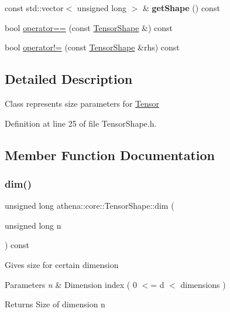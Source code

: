 \begin{DoxyCompactItemize}
\item 
\mbox{\label{classathena_1_1core_1_1_tensor_shape_ab76bd8f258b315eedcae3eae2d46a73d}} 
const std\+::vector$<$ unsigned long $>$ \& {\bfseries get\+Shape} () const
\item 
bool \mbox{\hyperlink{classathena_1_1core_1_1_tensor_shape_aa42737e3e51e76507bb60791889d4d9b}{operator==}} (const \mbox{\hyperlink{classathena_1_1core_1_1_tensor_shape}{Tensor\+Shape}} \&) const
\item 
bool \mbox{\hyperlink{classathena_1_1core_1_1_tensor_shape_acdb5b20f9922cb4d7ee29a868fd05b1b}{operator!=}} (const \mbox{\hyperlink{classathena_1_1core_1_1_tensor_shape}{Tensor\+Shape}} \&rhs) const
\end{DoxyCompactItemize}


\subsection{Detailed Description}
Class represents size parameters for \mbox{\hyperlink{classathena_1_1core_1_1_tensor}{Tensor}} 

Definition at line 25 of file Tensor\+Shape.\+h.



\subsection{Member Function Documentation}
\mbox{\label{classathena_1_1core_1_1_tensor_shape_ac0433f4e7a42e5307bb9fb976befdd47}} 
\subsubsection{\texorpdfstring{dim()}{dim()}}
{\footnotesize\ttfamily unsigned long athena\+::core\+::\+Tensor\+Shape\+::dim (\begin{DoxyParamCaption}\item[{unsigned long}]{n }\end{DoxyParamCaption}) const}

Gives size for certain dimension 
\begin{DoxyParams}{Parameters}
{\em n} & Dimension index ( 0 $<$= d $<$ dimensions ) \\
\hline
\end{DoxyParams}
\begin{DoxyReturn}{Returns}
Size of dimension n 
\end{DoxyReturn}


